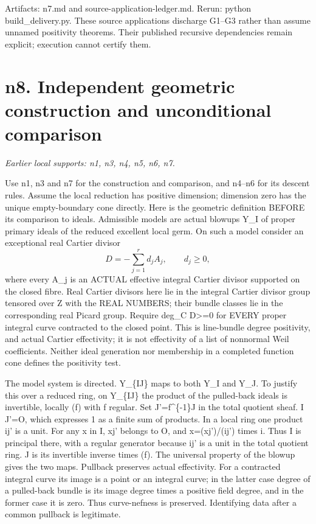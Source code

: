 \documentclass[11pt]{article}
\begin{document}
Artifacts: n7.md and source-application-ledger.md. Rerun: python build\_delivery.py. These source applications discharge G1--G3 rather than assume unnamed positivity theorems. Their published recursive dependencies remain explicit; execution cannot certify them.

\section{n8. Independent geometric construction and unconditional comparison}
\textit{Earlier local supports: n1, n3, n4, n5, n6, n7.}

Use n1, n3 and n7 for the construction and comparison, and n4--n6 for its descent rules. Assume the local reduction has positive dimension; dimension zero has the unique empty-boundary cone directly. Here is the geometric definition BEFORE its comparison to ideals. Admissible models are actual blowups Y\_I of proper primary ideals of the reduced excellent local germ. On such a model consider an exceptional real Cartier divisor
\[
D=-\sum_{j=1}^r d_j A_j,\qquad d_j\ge0,
\]
where every A\_j is an ACTUAL effective integral Cartier divisor supported on the closed fibre. Real Cartier divisors here lie in the integral Cartier divisor group tensored over Z with the REAL NUMBERS; their bundle classes lie in the corresponding real Picard group. Require deg\_C D>=0 for EVERY proper integral curve contracted to the closed point. This is line-bundle degree positivity, and actual Cartier effectivity; it is not effectivity of a list of nonnormal Weil coefficients. Neither ideal generation nor membership in a completed function cone defines the positivity test.

The model system is directed. Y\_\{IJ\} maps to both Y\_I and Y\_J. To justify this over a reduced ring, on Y\_\{IJ\} the product of the pulled-back ideals is invertible, locally (f) with f regular. Set J'=f\textasciicircum{}\{-1\}J in the total quotient sheaf. I J'=O, which expresses 1 as a finite sum of products. In a local ring one product ij' is a unit. For any x in I, xj' belongs to O, and x=(xj')/(ij') times i. Thus I is principal there, with a regular generator because ij' is a unit in the total quotient ring. J is its invertible inverse times (f). The universal property of the blowup gives the two maps. Pullback preserves actual effectivity. For a contracted integral curve its image is a point or an integral curve; in the latter case degree of a pulled-back bundle is its image degree times a positive field degree, and in the former case it is zero. Thus curve-nefness is preserved. Identifying data after a common pullback is legitimate.
\end{document}
